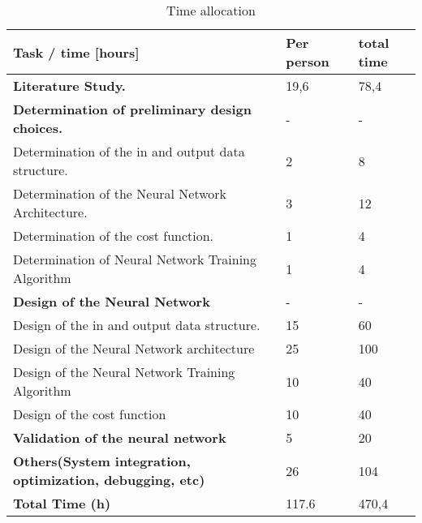 \begin{table}[h]
	\centering
	\caption{Time allocation}
	\label{tab:timeallocation}
	\begin{tabular}{|l|l|l|} \hline
		Task / time [hours]                                               			& Per person & total time \\ \hline
		\textbf{Literature Study.}                                 			& 19,6    & 78,4          \\
		\textbf{Determination of preliminary design choices.}      			&   -      & -              \\
		Determination of the in and output data structure.         			& 2       & 8             \\
		Determination of the Neural Network Architecture.          			& 3       & 12            \\
		Determination of the cost function.                        			& 1       & 4             \\
		Determination of Neural Network Training Algorithm         			& 1       & 4             \\
		\textbf{Design of the Neural Network}                      			& -       &  -            \\
		Design of the in and output data structure.                			& 15      & 60            \\
		Design of the Neural Network architecture                  			& 25      & 100           \\
		Design of the Neural Network Training Algorithm            			& 10      & 40            \\
		Design of the cost function                                			& 10      & 40            \\
		\textbf{Validation of the neural network}                  			& 5       & 20            \\
		\textbf{Others(System integration, optimization, debugging, etc)} 	& 26      & 104           \\
		\textbf{Total Time (h)}                                             & 117.6   & 470,4         \\ \hline
	\end{tabular}
\end{table}

